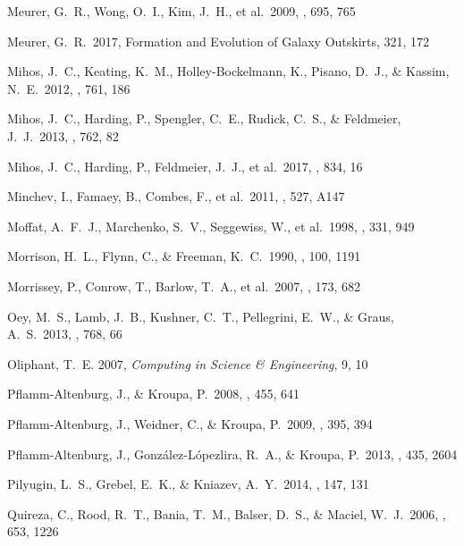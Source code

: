  Meurer, G.~R., Wong, O.~I., Kim, J.~H., et al.\ 2009, \apj, 695, 765 

 Meurer, G.~R.\ 2017, Formation and Evolution of Galaxy Outskirts, 321, 172 


 Mihos, J.~C., Keating, K.~M., Holley-Bockelmann, K., Pisano, D.~J., \& Kassim, N.~E.\ 2012, \apj, 761, 186 

 Mihos, J.~C., Harding, P., Spengler, C.~E., Rudick, C.~S., \& Feldmeier, J.~J.\ 2013, \apj, 762, 82 


 Mihos, J.~C., Harding, P., Feldmeier, J.~J., et al.\ 2017, \apj, 834, 16 


 Minchev, I., Famaey, B., Combes, F., et al.\ 2011, \aap, 527, A147 

 Moffat, A.~F.~J., Marchenko,
S.~V., Seggewiss, W., et al.\ 1998, \aap, 331, 949

 Morrison, H.~L., Flynn, C., \& Freeman, K.~C.\ 1990, \aj, 100, 1191 


 Morrissey, P., Conrow, T., Barlow, T.~A., et al.\ 2007, \apjs, 173, 682 

 Oey, M.~S., Lamb, J.~B., Kushner, C.~T., Pellegrini, E.~W., \& Graus, A.~S.\ 2013, \apj, 768, 66 

 Oliphant, T.~E. 2007, \emph{Computing in Science \& Engineering}, 9,
 10

 Pflamm-Altenburg, J., \& Kroupa, P.\ 2008, \nat, 455, 641 

 Pflamm-Altenburg,
 J., Weidner, C., \& Kroupa, P.\ 2009, \mnras, 395, 394

 Pflamm-Altenburg, J., Gonz{\'a}lez-L{\'o}pezlira, R.~A., \& Kroupa, P.\ 2013, \mnras, 435, 2604 

 Pilyugin, L.~S., Grebel, E.~K., \& Kniazev, A.~Y.\ 2014, \aj, 147, 131 


 Quireza, C., Rood, R.~T., Bania, T.~M., Balser, D.~S., \& Maciel, W.~J.\ 2006, \apj, 653, 1226 


